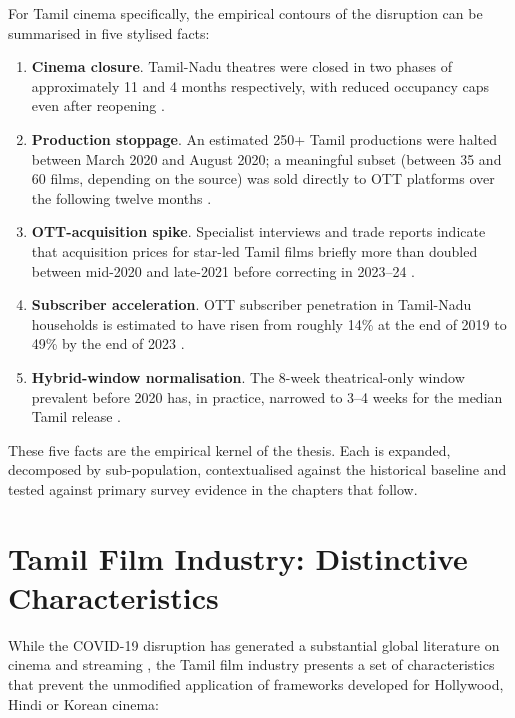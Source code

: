 For Tamil cinema specifically, the empirical contours of the
disruption can be summarised in five stylised facts:
\begin{enumerate}[itemsep=2pt]
  \item \textbf{Cinema closure}.  Tamil-Nadu theatres were closed
        in two phases of approximately 11 and 4 months respectively,
        with reduced occupancy caps even after reopening
        \citep{thehindu2021lockdown}.
  \item \textbf{Production stoppage}.  An estimated 250+ Tamil
        productions were halted between March 2020 and August 2020;
        a meaningful subset (between 35 and 60 films, depending on
        the source) was sold directly to OTT platforms over the
        following twelve months \citep{filmcompanion2021directott}.
  \item \textbf{OTT-acquisition spike}.  Specialist interviews and
        trade reports indicate that acquisition prices for star-led
        Tamil films briefly more than doubled between mid-2020 and
        late-2021 before correcting in 2023--24
        \citep{ormax2022,mpa2024}.
  \item \textbf{Subscriber acceleration}.  OTT subscriber penetration
        in Tamil-Nadu households is estimated to have risen from
        roughly 14\% at the end of 2019 to 49\% by the end of 2023
        \citep{statista2024,kpmg2023}.
  \item \textbf{Hybrid-window normalisation}.  The 8-week
        theatrical-only window prevalent before 2020 has, in
        practice, narrowed to 3--4 weeks for the median Tamil
        release \citep{ormax2024}.
\end{enumerate}

These five facts are the empirical kernel of the thesis.  Each is
expanded, decomposed by sub-population, contextualised against the
historical baseline and tested against primary survey evidence in
the chapters that follow.

\section{Tamil Film Industry: Distinctive Characteristics}
\label{sec:tamilcharacteristics}

While the COVID-19 disruption has generated a substantial global
literature on cinema and streaming \citep{lobato2019,tryon2009}, the
Tamil film industry presents a set of characteristics that prevent the
unmodified application of frameworks developed for Hollywood, Hindi or
Korean cinema:

